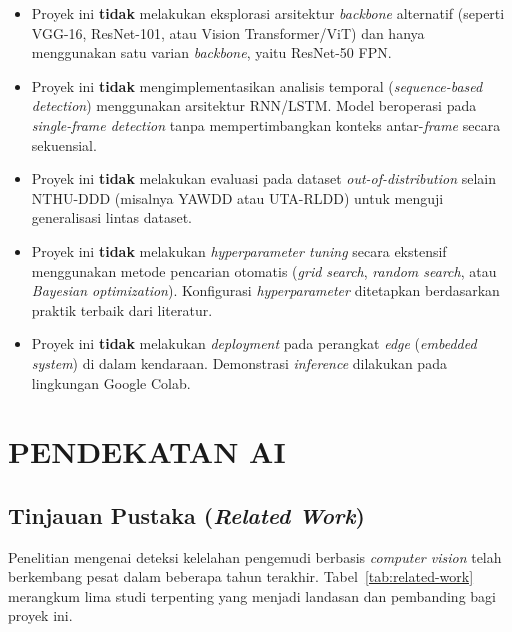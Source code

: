 \documentclass[11pt,a4paper,oneside]{report}
\begin{document}
\begin{itemize}[leftmargin=*]
    \item Proyek ini \textbf{tidak} melakukan eksplorasi arsitektur \textit{backbone} alternatif (seperti VGG-16, ResNet-101, atau Vision Transformer/ViT) dan hanya menggunakan satu varian \textit{backbone}, yaitu ResNet-50 FPN.
    \item Proyek ini \textbf{tidak} mengimplementasikan analisis temporal (\textit{sequence-based detection}) menggunakan arsitektur RNN/LSTM. Model beroperasi pada \textit{single-frame detection} tanpa mempertimbangkan konteks antar-\textit{frame} secara sekuensial.
    \item Proyek ini \textbf{tidak} melakukan evaluasi pada dataset \textit{out-of-distribution} selain NTHU-DDD (misalnya YAWDD atau UTA-RLDD) untuk menguji generalisasi lintas dataset.
    \item Proyek ini \textbf{tidak} melakukan \textit{hyperparameter tuning} secara ekstensif menggunakan metode pencarian otomatis (\textit{grid search}, \textit{random search}, atau \textit{Bayesian optimization}). Konfigurasi \textit{hyperparameter} ditetapkan berdasarkan praktik terbaik dari literatur.
    \item Proyek ini \textbf{tidak} melakukan \textit{deployment} pada perangkat \textit{edge} (\textit{embedded system}) di dalam kendaraan. Demonstrasi \textit{inference} dilakukan pada lingkungan Google Colab.
\end{itemize}

\chapter{PENDEKATAN AI}
\label{bab:pendekatan}

\section{Tinjauan Pustaka (\textit{Related Work})}

Penelitian mengenai deteksi kelelahan pengemudi berbasis \textit{computer vision} telah berkembang pesat dalam beberapa tahun terakhir. Tabel~\ref{tab:related-work} merangkum lima studi terpenting yang menjadi landasan dan pembanding bagi proyek ini.
\end{document}
